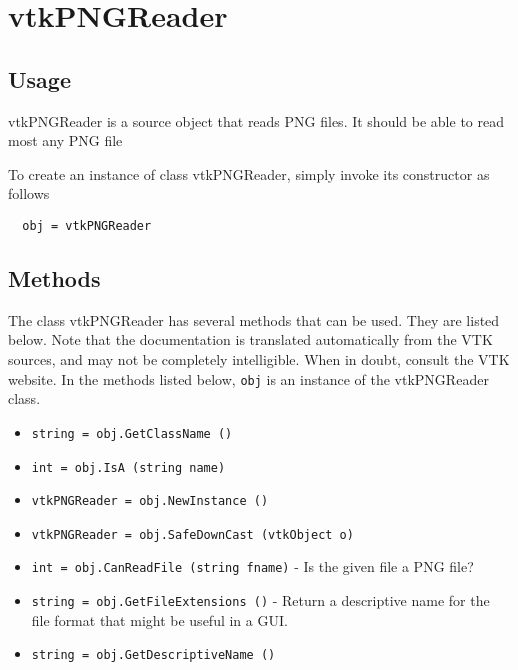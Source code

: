 \section{vtkPNGReader}

\subsection{Usage}

 vtkPNGReader is a source object that reads PNG files.
 It should be able to read most any PNG file


To create an instance of class vtkPNGReader, simply
invoke its constructor as follows
\begin{verbatim}
  obj = vtkPNGReader
\end{verbatim}
\subsection{Methods}

The class vtkPNGReader has several methods that can be used.
  They are listed below.
Note that the documentation is translated automatically from the VTK sources,
and may not be completely intelligible.  When in doubt, consult the VTK website.
In the methods listed below, \verb|obj| is an instance of the vtkPNGReader class.
\begin{itemize}
\item  \verb|string = obj.GetClassName ()|

\item  \verb|int = obj.IsA (string name)|

\item  \verb|vtkPNGReader = obj.NewInstance ()|

\item  \verb|vtkPNGReader = obj.SafeDownCast (vtkObject o)|

\item  \verb|int = obj.CanReadFile (string fname)| -  Is the given file a PNG file?

\item  \verb|string = obj.GetFileExtensions ()| -  Return a descriptive name for the file format that might be useful in a GUI.

\item  \verb|string = obj.GetDescriptiveName ()|

\end{itemize}
